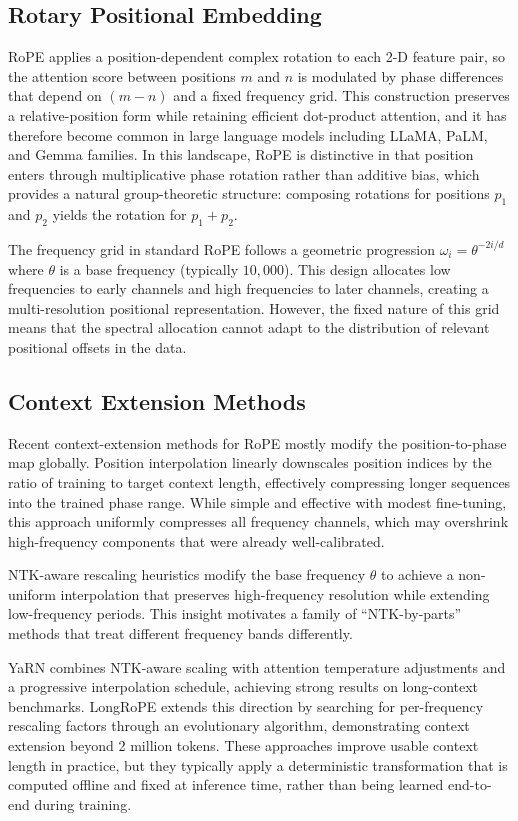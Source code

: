 \documentclass[conference]{IEEEtran}
\begin{document}
\subsection{Rotary Positional Embedding}
RoPE \cite{su2024roformer} applies a position-dependent complex rotation to each 2-D feature pair, so the attention score between positions $m$ and $n$ is modulated by phase differences that depend on $(m-n)$ and a fixed frequency grid. This construction preserves a relative-position form while retaining efficient dot-product attention, and it has therefore become common in large language models including LLaMA, PaLM, and Gemma families. In this landscape, RoPE is distinctive in that position enters through multiplicative phase rotation rather than additive bias, which provides a natural group-theoretic structure: composing rotations for positions $p_1$ and $p_2$ yields the rotation for $p_1+p_2$.

The frequency grid in standard RoPE follows a geometric progression $\omega_i = \theta^{-2i/d}$ where $\theta$ is a base frequency (typically $10{,}000$). This design allocates low frequencies to early channels and high frequencies to later channels, creating a multi-resolution positional representation. However, the fixed nature of this grid means that the spectral allocation cannot adapt to the distribution of relevant positional offsets in the data.

\subsection{Context Extension Methods}
Recent context-extension methods for RoPE mostly modify the position-to-phase map globally. Position interpolation \cite{chen2023extending} linearly downscales position indices by the ratio of training to target context length, effectively compressing longer sequences into the trained phase range. While simple and effective with modest fine-tuning, this approach uniformly compresses all frequency channels, which may overshrink high-frequency components that were already well-calibrated.

NTK-aware rescaling heuristics modify the base frequency $\theta$ to achieve a non-uniform interpolation that preserves high-frequency resolution while extending low-frequency periods. This insight motivates a family of ``NTK-by-parts'' methods that treat different frequency bands differently.

YaRN \cite{peng2024yarn} combines NTK-aware scaling with attention temperature adjustments and a progressive interpolation schedule, achieving strong results on long-context benchmarks. LongRoPE \cite{ding2024longrope} extends this direction by searching for per-frequency rescaling factors through an evolutionary algorithm, demonstrating context extension beyond 2 million tokens. These approaches improve usable context length in practice, but they typically apply a deterministic transformation that is computed offline and fixed at inference time, rather than being learned end-to-end during training.
\end{document}
